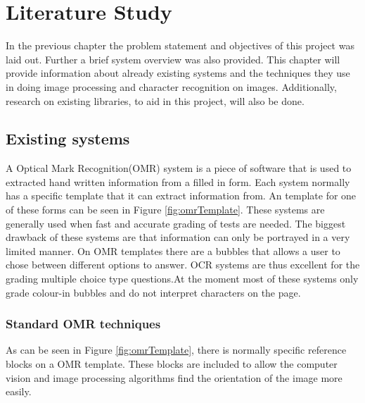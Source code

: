 \chapter{Literature Study}
\label{ch:LiteratureStudy}
    \graphicspath{{Chapter2/Chapter2Figures/}}

In the previous chapter the problem statement and objectives of this project was laid out. Further a brief system overview was also provided.
This chapter will provide information about already existing systems and the techniques they use in doing image processing and character recognition on images. Additionally, research on existing libraries, to aid in this project, will also be done.

\section{Existing systems}
A Optical Mark Recognition(OMR) system is a piece of software that is used to extracted hand written information from a filled in form. Each system normally has a specific template that it can extract information from. An template for one of these forms can be seen in Figure \ref{fig:omrTemplate}. These systems are generally used when fast and accurate grading of tests are needed. The biggest drawback of these systems are that information can only be portrayed in a very limited manner. On OMR templates there are a bubbles that allows a user to chose between different options to answer. OCR systems are thus excellent for the grading multiple choice type questions.At the moment most of these systems only grade colour-in bubbles and do not interpret characters on the page.

\subsection{Standard OMR techniques}
\label{sec:StandardTech}
As can be seen in Figure \ref{fig:omrTemplate}, there is normally specific reference blocks on a OMR template. These blocks are included to allow the computer vision and image processing algorithms find the orientation of the image more easily.

